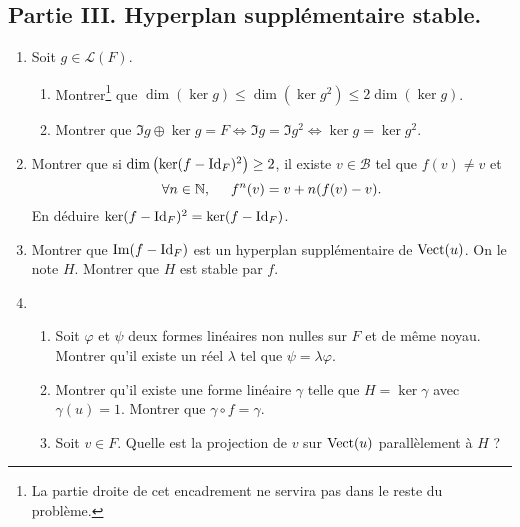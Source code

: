 \subsection*{Partie III. Hyperplan supplémentaire stable.}
\begin{enumerate}
 \item Soit $g\in \mathcal{L}(F)$.
\begin{enumerate}
 \item  Montrer\footnote{La partie droite de cet encadrement ne servira pas dans le reste du problème.} que  $
\dim (\ker g ) \leq \dim (\ker g^2 ) \leq 2 \dim (\ker g)$.
 \item Montrer que $\Im g \oplus \ker g = F \Leftrightarrow \Im g = \Im g^2 \Leftrightarrow \ker g = \ker g^2$.
\end{enumerate}
 \item Montrer que si $\dim\left(\ker (f-\operatorname{Id}_F)^2 \right)\geq 2$, il existe $v\in \mathcal{B}$ tel que $f(v)\neq v$ et 
\[
 \forall n \in \mathbb{N}, \hspace{0.5cm} f^n(v) = v + n(f(v) -v).
\]
En déduire $\ker (f-\operatorname{Id}_F)^2 = \ker (f-\operatorname{Id}_F)$.
 \item Montrer que $\operatorname{Im} (f-\operatorname{Id}_F)$ est un hyperplan supplémentaire de $\operatorname{Vect}(u)$. On le note $H$. Montrer que $H$ est stable par $f$.
\item 
\begin{enumerate}
 \item Soit $\varphi$ et $\psi$ deux formes linéaires non nulles sur $F$ et de même noyau. Montrer qu'il existe un réel $\lambda$ tel que $\psi = \lambda \varphi$.
 \item Montrer qu'il existe une forme linéaire $\gamma$ telle que $H=\ker \gamma$ avec $\gamma(u) = 1$. Montrer que $\gamma \circ f = \gamma$. 
 \item Soit $v\in F$. Quelle est la projection de $v$ sur $\operatorname{Vect}(u)$ parallèlement à $H$ ?
\end{enumerate}
\end{enumerate}

